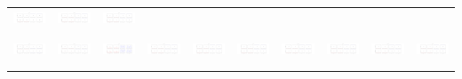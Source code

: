 \documentclass[]{article}
\begin{document}
\begin{table}[h]
\begin{tabular}{| c | c | c | c | c | c | c | c | c | c |}
		\includegraphics[width=0.09\linewidth]{0.20_0.70.png} &
		\includegraphics[width=0.09\linewidth]{0.20_0.80.png} &
		\includegraphics[width=0.09\linewidth]{0.20_0.90.png} \\
		& & & & & & & & & \\
		\hline
		& & & & & & & & & \\
		\includegraphics[width=0.09\linewidth]{0.30_0.00.png} &
		\includegraphics[width=0.09\linewidth]{0.30_0.10.png} &
		\includegraphics[width=0.09\linewidth]{0.30_0.20.png} &
		\includegraphics[width=0.09\linewidth]{0.30_0.30.png} &
		\includegraphics[width=0.09\linewidth]{0.30_0.40.png} &
		\includegraphics[width=0.09\linewidth]{0.30_0.50.png} &
		\includegraphics[width=0.09\linewidth]{0.30_0.60.png} &
		\includegraphics[width=0.09\linewidth]{0.30_0.70.png} &
		\includegraphics[width=0.09\linewidth]{0.30_0.80.png} &
		\includegraphics[width=0.09\linewidth]{0.30_0.90.png} \\
		& & & & & & & & & \\
		\hline
		& & & & & & & & & \\

\end{tabular}
\end{table}
\end{document}
